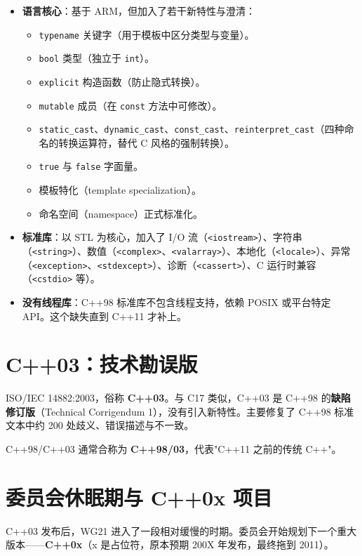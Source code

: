 \documentclass[12pt,a4paper,fontset=fandol]{ctexbook}
\newcommand{\yearlabel}[1]{%
  \tcbox[on line,colback=yearheadbg,colframe=yearheadbg,
    boxrule=0pt,arc=1pt,left=3pt,right=3pt,top=1pt,bottom=1pt,
    colupper=white,fontupper=\scriptsize\bfseries]{#1}}
\newcommand{\kw}[1]{\texttt{#1}}
\newcommand{\yrlbl}[1]{\yearlabel{#1}}
\begin{document}
\begin{itemize}
  \item \textbf{语言核心}：基于 ARM，但加入了若干新特性与澄清：
    \begin{itemize}
      \item \kw{typename} 关键字（用于模板中区分类型与变量）。
      \item \kw{bool} 类型（独立于 \kw{int}）。
      \item \kw{explicit} 构造函数（防止隐式转换）。
      \item \kw{mutable} 成员（在 \kw{const} 方法中可修改）。
      \item \kw{static\_cast}、\kw{dynamic\_cast}、\kw{const\_cast}、\kw{reinterpret\_cast}（四种命名的转换运算符，替代 C 风格的强制转换）。
      \item \kw{true} 与 \kw{false} 字面量。
      \item 模板特化（template specialization）。
      \item 命名空间（namespace）正式标准化。
    \end{itemize}
  \item \textbf{标准库}：以 STL 为核心，加入了 I/O 流（\texttt{<iostream>}）、字符串（\texttt{<string>}）、数值（\texttt{<complex>}、\texttt{<valarray>}）、本地化（\texttt{<locale>}）、异常（\texttt{<exception>}、\texttt{<stdexcept>}）、诊断（\texttt{<cassert>}）、C 运行时兼容（\texttt{<cstdio>} 等）。
  \item \textbf{没有线程库}：C++98 标准库不包含线程支持，依赖 POSIX 或平台特定 API。这个缺失直到 C++11 才补上。
\end{itemize}

\section{C++03：技术勘误版}

\yrlbl{2003} ISO/IEC 14882:2003，俗称 \textbf{C++03}。与 C17 类似，C++03 是 C++98 的\textbf{缺陷修订版}（Technical Corrigendum 1），没有引入新特性。主要修复了 C++98 标准文本中约 200 处歧义、错误描述与不一致。

C++98/C++03 通常合称为 \textbf{C++98/03}，代表"C++11 之前的传统 C++"。

\section{委员会休眠期与 C++0x 项目}

\yrlbl{2003-2011} C++03 发布后，WG21 进入了一段相对缓慢的时期。委员会开始规划下一个重大版本——\textbf{C++0x}（x 是占位符，原本预期 200X 年发布，最终拖到 2011）。
\end{document}
